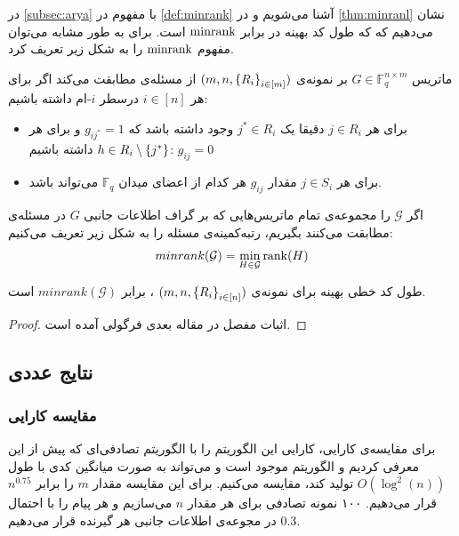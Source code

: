 در
\autoref{subsec:arya}
با مفهوم
در
\autoref{def:minrank}
آشنا می‌شویم و در
\autoref{thm:minranl}
نشان می‌دهیم که که طول کد بهینه در
\icod
برابر
$\mathrm{minrank}$
است. برای
\picod
به طور مشابه می‌توان مفهوم
$\mathrm{minrank}$
را به شکل زیر تعریف کرد.
\begin{definition}
    ماتریس
    $G \in \mathbb{F}^{n\times m}_q$
    بر نمونه‌ی
    $(m, n, \left\{ R_i \right\}_{i \in [m]})$
    از مسئله‌ی
    \picod
    مطابقت می‌کند اگر برای هر
    $i \in [n]$
    درسطر
    $i$-ام داشته باشیم:
    \begin{itemize}
        \item
        برای هر
        $j \in R_i$
        دقیقا یک
        $j^\ast \in R_i$
        وجود داشته باشد که
        $g_{i j^\ast}= 1$
        و برای هر
        $h \in R_i \setminus \left\{ j^\ast \right\}$
        داشته باشیم:
        $g_{i j} = 0$
        \item
        برای هر
        $j \in S_i$
        مقدار
        $g_{i j}$
        هر کدام از اعضای میدان
        $\mathbb{F}_q$
        می‌تواند باشد.
    \end{itemize}
\end{definition}
\begin{definition}
    اگر
    $\mathcal{G}$
    را مجموعه‌ی تمام ماتریس‌هایی که بر گراف اطلاعات جانبی    $G$ در مسئله‌ی
    \picod
    مطابقت می‌کنند بگیریم، رتبه‌کمینه‌ی مسئله را به شکل زیر تعریف می‌کنیم:
    $$minrank(\mathcal{G}) = \min_{H \in \mathcal{G}} \operatorname{rank}(H)$$

\end{definition}
\begin{theorem}
    \label{theorem:pliable2016:theorem3}
    طول کد خطی بهینه برای نمونه‌ی
    $(m, n, \left\{ R_i \right\}_{i \in [n]})$
    ،
    \picod
    برابر
    $minrank(\mathcal{G})$
    است.
\end{theorem}
\begin{proof}
    اثبات مفصل در مقاله بعدی فرگولی
    \cite{song2016deterministic}
    آمده است.
\end{proof}

\subsection{
    نتایج عددی
}
\subsubsection{
    مقایسه کارایی
}
برای مقایسه‌ی کارایی، کارایی این الگوریتم را با الگوریتم تصادفی‌ای که پیش از این معرفی کردیم و  الگوریتم موجود است و می‌تواند به صورت میانگین کدی با طول
$O(\log^2(n))$
تولید کند، مقایسه می‌کنیم. برای این مقایسه مقدار
$m$
را برابر
$n^{0.75}$
قرار می‌دهیم. ۱۰۰ نمونه تصادفی برای هر مقدار
$n$
می‌سازیم و هر پیام را با احتمال
$0.3$
در مجوعه‌ی اطلاعات جانبی هر گیرنده قرار می‌دهیم.

